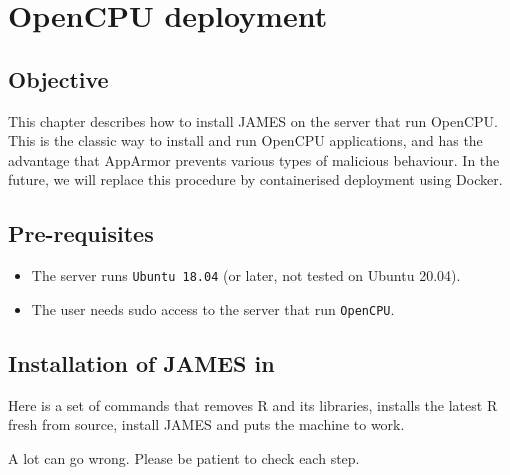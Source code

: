 \documentclass[
]{book}
\providecommand{\tightlist}{%
  \setlength{\itemsep}{0pt}\setlength{\parskip}{0pt}}
\begin{document}
\hypertarget{opencpu-deployment}{%
\chapter{OpenCPU deployment}\label{opencpu-deployment}}

\hypertarget{objective-1}{%
\section{Objective}\label{objective-1}}

This chapter describes how to install JAMES on the server that run OpenCPU. This is the classic way to install and run OpenCPU applications, and has the advantage that AppArmor prevents various types of malicious behaviour. In the future, we will replace this procedure by containerised deployment using Docker.

\hypertarget{pre-requisites}{%
\section{Pre-requisites}\label{pre-requisites}}

\begin{itemize}
\tightlist
\item
  The server runs \texttt{Ubuntu\ 18.04} (or later, not tested on Ubuntu 20.04).
\item
  The user needs sudo access to the server that run \texttt{OpenCPU}.
\end{itemize}

\hypertarget{installation-of-james-in}{%
\section{Installation of JAMES in}\label{installation-of-james-in}}

Here is a set of commands that removes R and its libraries, installs the latest
R fresh from source, install JAMES and puts the machine to work.

A lot can go wrong. Please be patient to check each step.
\end{document}
